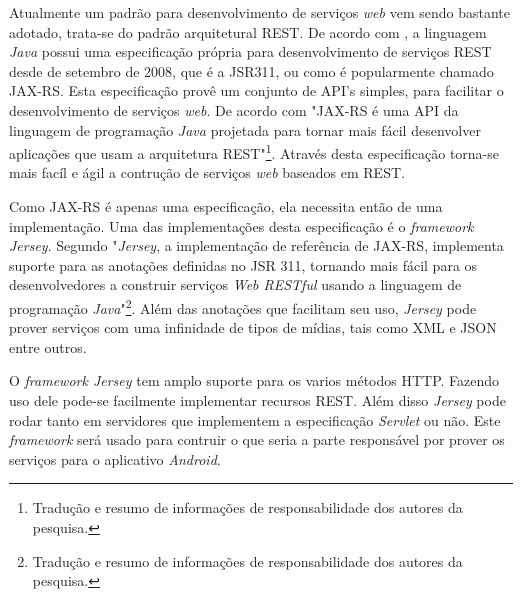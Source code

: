 
	\par Atualmente um padrão para desenvolvimento de serviços \textit{web} vem
sendo bastante adotado, trata-se do padrão arquitetural REST. De acordo com
, a linguagem \textit{Java} possui uma especificação
própria para desenvolvimento de serviços REST desde de setembro de 2008, que é
a JSR311, ou como é popularmente chamado JAX-RS. Esta especificação provê um
conjunto de API's simples, para facilitar o desenvolvimento de serviços
\textit{web}. De acordo com  "JAX-RS é uma API da
linguagem de programação \textit{Java} projetada para tornar mais fácil
desenvolver aplicações que usam a arquitetura REST"\footnote{Tradução e resumo
de informações de responsabilidade dos autores da pesquisa.}. Através desta
especificação torna-se mais facíl e ágil a contrução de serviços \textit{web}
baseados em REST.

	\par Como JAX-RS é apenas uma especificação, ela necessita então de uma
implementação. Uma das implementações desta especificação é o
\textit{framework Jersey}. Segundo  "\textit{Jersey}, a
implementação de referência de JAX-RS, implementa suporte para as anotações
definidas no JSR 311, tornando mais fácil para os desenvolvedores a construir
serviços \textit{Web RESTful} usando a linguagem de programação
\textit{Java}"\footnote{Tradução e resumo de informações de responsabilidade
dos autores da pesquisa.}. Além das anotações que facilitam seu uso,
\textit{Jersey} pode prover serviços com uma infinidade de tipos de
mídias, tais como XML e JSON entre outros.

	\par O \textit{framework Jersey} tem amplo suporte para os varios métodos HTTP.
Fazendo uso dele pode-se facilmente implementar recursos REST. Além disso
\textit{Jersey}  pode rodar tanto em servidores que implementem a especificação
\textit{Servlet} ou não. Este \textit{framework} será usado para contruir o que
seria a parte responsável por prover os serviços para o aplicativo
\textit{Android}.